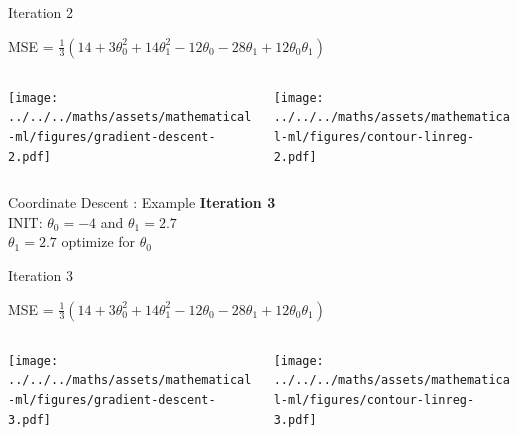 \documentclass{beamer}
\begin{document}
\begin{frame}{Iteration 2}

MSE = $\frac{1}{3}(14+3\theta_{0}^{2}+14\theta_{1}^{2}-12\theta_{0}-28\theta_{1}+12\theta_{0}\theta_{1})$\\

\begin{columns}
\begin{column}{0.6\textwidth}
\begin{adjustbox}{max totalsize={\textwidth},center}
\texttt{[image: ../../../maths/assets/mathematical-ml/figures/gradient-descent-2.pdf]}
\end{adjustbox}

\end{column}
\begin{column}{0.5\textwidth}
\begin{adjustbox}{max totalsize={\textwidth},center}
\texttt{[image: ../../../maths/assets/mathematical-ml/figures/contour-linreg-2.pdf]}
\end{adjustbox}
\end{column}
\end{columns}


\end{frame}

\begin{frame}{Coordinate Descent : Example}
\textbf{Iteration 3}\\
\vspace{0.5cm}
INIT: $\theta_{0} = -4$ and $\theta_{1}  = 2.7$\\

\vspace{0.5cm}
$\theta_1 = 2.7$ optimize for $\theta_{0}$\\ 


\end{frame}

\begin{frame}{Iteration 3}

MSE = $\frac{1}{3}(14+3\theta_{0}^{2}+14\theta_{1}^{2}-12\theta_{0}-28\theta_{1}+12\theta_{0}\theta_{1})$\\

\begin{columns}
\begin{column}{0.6\textwidth}
\begin{adjustbox}{max totalsize={\textwidth},center}
\texttt{[image: ../../../maths/assets/mathematical-ml/figures/gradient-descent-3.pdf]}
\end{adjustbox}

\end{column}
\begin{column}{0.5\textwidth}
\begin{adjustbox}{max totalsize={\textwidth},center}
\texttt{[image: ../../../maths/assets/mathematical-ml/figures/contour-linreg-3.pdf]}
\end{adjustbox}
\end{column}
\end{columns}


\end{frame}
\end{document}
